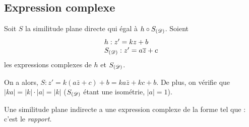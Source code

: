       \subsection{Expression complexe}
            Soit $S$ la similitude plane directe qui \'egal \`a $h \circ S_{(\mathscr{D})}$.
            Soient 
            \[
                  \begin{array}{l}
                        h : z' = k z + b \\
                        S_{(\mathscr{D})} : z' = a \overline{z} + c 
                  \end{array}
            \]
            les expressions complexes de $h$ et $S_{(\mathscr{D})}$.
            
            On a alors, $S : z' = k \left( a \bar{z} + c \right) + b = k a \bar{z} + k c + b$.
            De plus, on v\'erifie que $|k a| = |k| \cdot |a| = |k|$ ($S_{(\mathscr{D})}$ \'etant une isom\'etrie, $|a| = 1$).
            
            Une similitude plane indirecte a une expression complexe de la forme 
            tel que  : c'est le \emph{rapport}.
            
